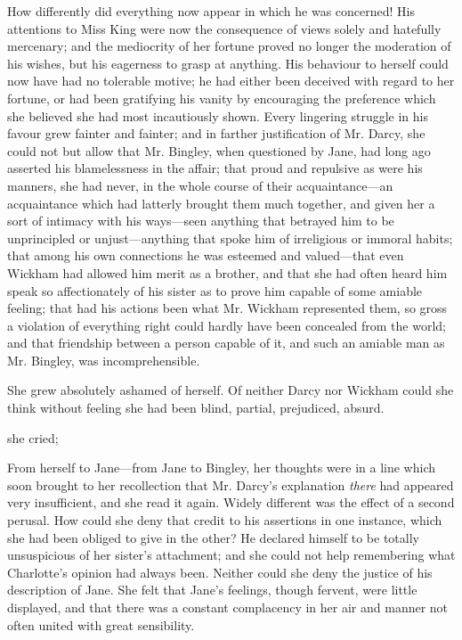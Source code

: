 How differently did everything now appear in which he was concerned! His attentions to Miss King were now the consequence of views solely and hatefully mercenary; and the mediocrity of her fortune proved no longer the moderation of his wishes, but his eagerness to grasp at anything. His behaviour to herself could now have had no tolerable motive; he had either been deceived with regard to her fortune, or had been gratifying his vanity by encouraging the preference which she believed she had most incautiously shown. Every lingering struggle in his favour grew fainter and fainter; and in farther justification of Mr. Darcy, she could not but allow that Mr. Bingley, when questioned by Jane, had long ago asserted his blamelessness in the affair; that proud and repulsive as were his manners, she had never, in the whole course of their acquaintance---an acquaintance which had latterly brought them much together, and given her a sort of intimacy with his ways---seen anything that betrayed him to be unprincipled or unjust---anything that spoke him of irreligious or immoral habits; that among his own connections he was esteemed and valued---that even Wickham had allowed him merit as a brother, and that she had often heard him speak so affectionately of his sister as to prove him capable of some amiable feeling; that had his actions been what Mr. Wickham represented them, so gross a violation of everything right could hardly have been concealed from the world; and that friendship between a person capable of it, and such an amiable man as Mr. Bingley, was incomprehensible.

She grew absolutely ashamed of herself. Of neither Darcy nor Wickham could she think without feeling she had been blind, partial, prejudiced, absurd.

 she cried; 

From herself to Jane---from Jane to Bingley, her thoughts were in a line which soon brought to her recollection that Mr. Darcy's explanation {\em there} had appeared very insufficient, and she read it again. Widely different was the effect of a second perusal. How could she deny that credit to his assertions in one instance, which she had been obliged to give in the other? He declared himself to be totally unsuspicious of her sister's attachment; and she could not help remembering what Charlotte's opinion had always been. Neither could she deny the justice of his description of Jane. She felt that Jane's feelings, though fervent, were little displayed, and that there was a constant complacency in her air and manner not often united with great sensibility.

